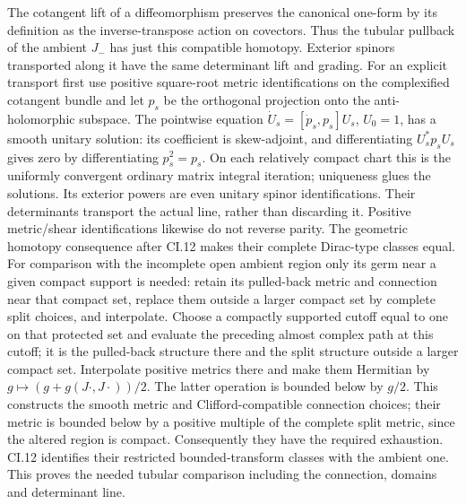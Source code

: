 \documentclass[
  11pt,
]{article}
\begin{document}
The cotangent lift of a diffeomorphism preserves the canonical one-form
by its definition as the inverse-transpose action on covectors. Thus the
tubular pullback of the ambient \(J_-\) has just this compatible
homotopy. Exterior spinors transported along it have the same
determinant lift and grading. For an explicit transport first use
positive square-root metric identifications on the complexified
cotangent bundle and let \(p_s\) be the orthogonal projection onto the
anti-holomorphic subspace. The pointwise equation
\(\dot U_s=[\dot p_s,p_s]U_s\), \(U_0=1\), has a smooth unitary
solution: its coefficient is skew-adjoint, and differentiating
\(U_s^*p_sU_s\) gives zero by differentiating \(p_s^2=p_s\). On each
relatively compact chart this is the uniformly convergent ordinary
matrix integral iteration; uniqueness glues the solutions. Its exterior
powers are even unitary spinor identifications. Their determinants
transport the actual line, rather than discarding it. Positive
metric/shear identifications likewise do not reverse parity. The
geometric homotopy consequence after CI.12 makes their complete
Dirac-type classes equal. For comparison with the incomplete open
ambient region only its germ near a given compact support is needed:
retain its pulled-back metric and connection near that compact set,
replace them outside a larger compact set by complete split choices, and
interpolate. Choose a compactly supported cutoff equal to one on that
protected set and evaluate the preceding almost complex path at this
cutoff; it is the pulled-back structure there and the split structure
outside a larger compact set. Interpolate positive metrics there and
make them Hermitian by \(g\mapsto(g+g(J\cdot,J\cdot))/2\). The latter
operation is bounded below by \(g/2\). This constructs the smooth metric
and Clifford-compatible connection choices; their metric is bounded
below by a positive multiple of the complete split metric, since the
altered region is compact. Consequently they have the required
exhaustion. CI.12 identifies their restricted bounded-transform classes
with the ambient one. This proves the needed tubular comparison
including the connection, domains and determinant line.
\end{document}
